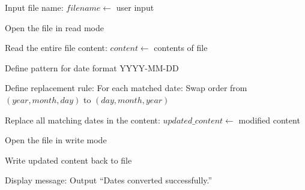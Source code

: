 \begin{algorithm}
\caption{Convert Date Format from YYYY-MM-DD to DD-MM-YYYY in a File}
\begin{algorithmic}[1]

\STATE Input file name:
\STATE $filename \gets$ user input

\STATE Open the file in read mode

\STATE Read the entire file content:
\STATE $content \gets$ contents of file

\STATE Define pattern for date format YYYY-MM-DD

\STATE Define replacement rule:
\STATE For each matched date:
\STATE Swap order from $(year, month, day)$ to $(day, month, year)$

\STATE Replace all matching dates in the content:
\STATE $updated\_content \gets$ modified content

\STATE Open the file in write mode

\STATE Write updated content back to file

\STATE Display message:
\STATE Output ``Dates converted successfully.''

\end{algorithmic}
\end{algorithm}